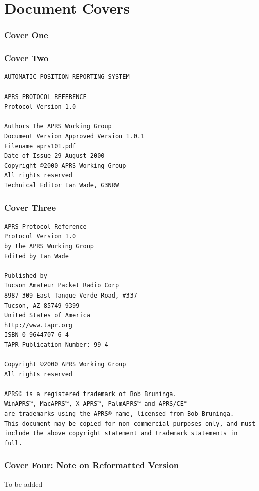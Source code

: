 \part*{Document Covers}

\section*{Cover One}



\section*{Cover Two}

\begin{verbatim}
AUTOMATIC POSITION REPORTING SYSTEM

APRS PROTOCOL REFERENCE
Protocol Version 1.0

Authors The APRS Working Group
Document Version Approved Version 1.0.1
Filename aprs101.pdf
Date of Issue 29 August 2000
Copyright ©2000 APRS Working Group
All rights reserved
Technical Editor Ian Wade, G3NRW
\end{verbatim}

\newpage

\section*{Cover Three}

\begin{verbatim}
APRS Protocol Reference
Protocol Version 1.0
by the APRS Working Group
Edited by Ian Wade

Published by
Tucson Amateur Packet Radio Corp
8987–309 East Tanque Verde Road, #337
Tucson, AZ 85749-9399
United States of America
http://www.tapr.org
ISBN 0-9644707-6-4
TAPR Publication Number: 99-4

Copyright ©2000 APRS Working Group
All rights reserved

APRS® is a registered trademark of Bob Bruninga.
WinAPRS™, MacAPRS™, X-APRS™, PalmAPRS™ and APRS/CE™
are trademarks using the APRS® name, licensed from Bob Bruninga.
This document may be copied for non-commercial purposes only, and must
include the above copyright statement and trademark statements in full.
\end{verbatim}

\newpage
\section*{Cover Four: Note on Reformatted Version}
To be added




